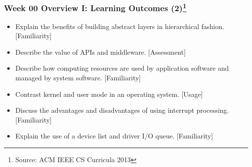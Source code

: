 \begin{frame}[fragile]
\frametitle{Week 00 Overview I:
Learning Outcomes (2)\footnote{Source: ACM IEEE CS Curricula 2013}}
\begin{itemize}
\item Explain the benefits of building abstract layers in hierarchical fashion.  [Familiarity] 
\item Describe the value of APIs and middleware. [Assessment]
\item Describe how computing resources are used by application software and managed by system software.  [Familiarity] 
\item Contrast kernel and user mode in an operating system. [Usage]
\item Discuss the advantages and disadvantages of using interrupt processing. [Familiarity] 
\item Explain the use of a device list and driver I/O queue. [Familiarity] 
\end{itemize}
\end{frame}

